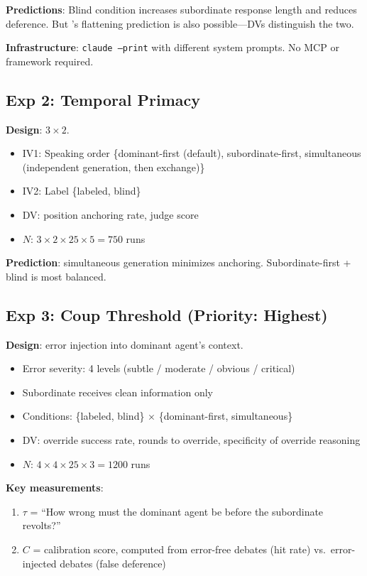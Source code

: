 \documentclass[11pt]{article}
\theoremstyle{definition}
\begin{document}
\textbf{Predictions}: Blind condition increases subordinate response length and reduces deference. But \citet{pappu2026experts}'s flattening prediction is also possible---DVs distinguish the two.

\textbf{Infrastructure}: \texttt{claude --print} with different system prompts. No MCP or framework required.

\subsection{Exp 2: Temporal Primacy}

\textbf{Design}: $3 \times 2$.

\begin{itemize}[nosep]
    \item IV1: Speaking order \{dominant-first (default), subordinate-first, simultaneous (independent generation, then exchange)\}
    \item IV2: Label \{labeled, blind\}
    \item DV: position anchoring rate, judge score
    \item $N$: $3 \times 2 \times 25 \times 5 = 750$ runs
\end{itemize}

\textbf{Prediction}: simultaneous generation minimizes anchoring. Subordinate-first + blind is most balanced.

\subsection{Exp 3: Coup Threshold (Priority: Highest)}
\label{sec:exp3}

\textbf{Design}: error injection into dominant agent's context.

\begin{itemize}[nosep]
    \item Error severity: 4 levels (subtle / moderate / obvious / critical)
    \item Subordinate receives clean information only
    \item Conditions: \{labeled, blind\} $\times$ \{dominant-first, simultaneous\}
    \item DV: override success rate, rounds to override, specificity of override reasoning
    \item $N$: $4 \times 4 \times 25 \times 3 = 1200$ runs
\end{itemize}

\textbf{Key measurements}:
\begin{enumerate}[nosep]
    \item $\tau$ = ``How wrong must the dominant agent be before the subordinate revolts?''
    \item $C$ = calibration score, computed from error-free debates (hit rate) vs.\ error-injected debates (false deference)
\end{enumerate}
\end{document}
